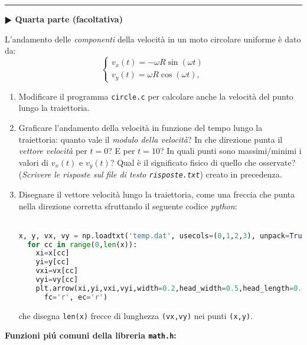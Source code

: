 \documentclass[11pt]{article}
\begin{document}
\hrule
\vspace{1mm}\textbf{$\RHD$ Quarta parte (facoltativa)\\}

L'andamento delle {\em componenti\/} della velocit\`a in un moto circolare uniforme \`e dato da:
\[
\left\{ \begin{array}{ll} 
v_x(t) = - \omega R \sin \left(\omega t \right)
\\ 
v_y(t) = \omega R \cos \left(\omega t \right),
\end{array}
\right.
\]

\begin{enumerate}
\item Modificare il programma \texttt{circle.c} per calcolare anche la velocit\`a del punto lungo la traiettoria.
\item Graficare l'andamento della velocit\`a in funzione del tempo lungo la traiettoria: quanto vale il {\em modulo della velocit\`a\/}? In che direzione punta il {\em vettore velocit\`a\/} per $t=0$?
E per $t=10$? In quali punti  sono massimi/minimi i valori di $v_x(t)$ e $v_y(t)$? Qual \`e il significato fisico di quello che osservate? ({\em Scrivere le risposte sul file di testo \texttt{risposte.txt}\/}) creato in precedenza.
\item Disegnare il vettore velocit\`a lungo la traiettoria, come una freccia che punta nella direzione corretta sfruttando
  il seguente codice \emph{python}:\\
\\

\begin{lstlisting}[language=Python,numbers=none]
  x, y, vx, vy = np.loadtxt('temp.dat', usecols=(0,1,2,3), unpack=True)
  for cc in range(0,len(x)):
    xi=x[cc]
    yi=y[cc]
    vxi=vx[cc]
    vyi=vy[cc]
    plt.arrow(xi,yi,vxi,vyi,width=0.2,head_width=0.5,head_length=0.3, 
      fc='r', ec='r')   
\end{lstlisting}
che disegna \texttt{len(x)} frecce di lunghezza \texttt{(vx,vy)} nei punti \texttt{(x,y)}. 
\end{enumerate}  
\vspace{-2mm}
\newpage
\textbf{Funzioni pi\'u comuni della libreria \texttt{math.h}:}
\end{document}

